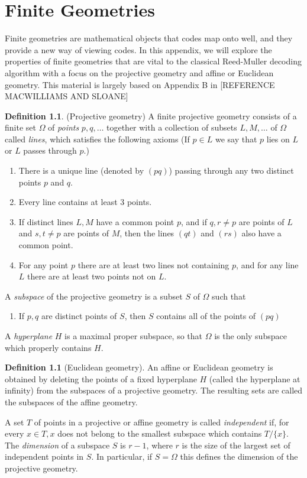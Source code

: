 \documentclass[12pt,twoside]{reedthesis}
\theoremstyle{definition}
\newtheorem{definition}[theorem]{Definition}
\begin{document}
	
\chapter{Finite Geometries} \label{finite_geom_chapter}
Finite geometries are mathematical objects that codes map onto well, and they provide a new way of viewing codes. In this appendix, we will explore the properties of finite geometries that are vital to the classical Reed-Muller decoding algorithm with a focus on the projective geometry and affine or Euclidean geometry. This material is largely based on Appendix B in [REFERENCE MACWILLIAMS AND SLOANE]

\begin{definition}(Projective geometry) A finite projective geometry consists of a finite set $\Omega$ of \textit{points} $p, q, \ldots$ together with a collection of subsets $L, M, \ldots$ of $\Omega$ called \textit{lines}, which satisfies the following axioms (If $p \in L$ we say that $p$ lies on $L$ or $L$ passes through $p$.)
\begin{enumerate}
\item There is a unique line (denoted by $(pq)$) passing through any two distinct points $p$ and $q$.
\item Every line contains at least 3 points.
\item If distinct lines $L, M$ have a common point $p$, and if $q,  r\neq p$ are points of $L$ and $s, t\neq p$ are points of $M$, then the lines $(qt)$ and $(rs)$ also have a common point.
\item For any point $p$ there are at least two lines not containing $p$, and for any line $L$ there are at least two points not on $L$.
\end{enumerate}
A \textit{subspace} of the projective geometry is a subset $S$ of $\Omega$ such that
\begin{enumerate}[resume]
\item If $p,q$ are distinct points of $S$, then $S$ contains all of the points of $(pq)$
\end{enumerate}
A \textit{hyperplane} $H$ is a maximal proper subspace, so that $\Omega$ is the only subspace which properly contains $H$.
\end{definition}

\begin{definition}[Euclidean geometry] An affine or Euclidean geometry is obtained by deleting the points of a fixed hyperplane $H$ (called the hyperplane at infinity) from the subspaces of a projective geometry. The resulting sets are called the subspaces of the affine geometry.

A set $T$ of points in a projective or affine geometry is called \textit{independent} if, for every $x \in T, x$ does not belong to the smallest subspace which contains $T/\{x\}$. The \textit{dimension} of a subspace $S$ is $r-1$, where $r$ is the size of the largest set of independent points in $S$. In particular, if $S = \Omega$ this defines the dimension of the projective geometry.
\end{definition}
\end{document}
